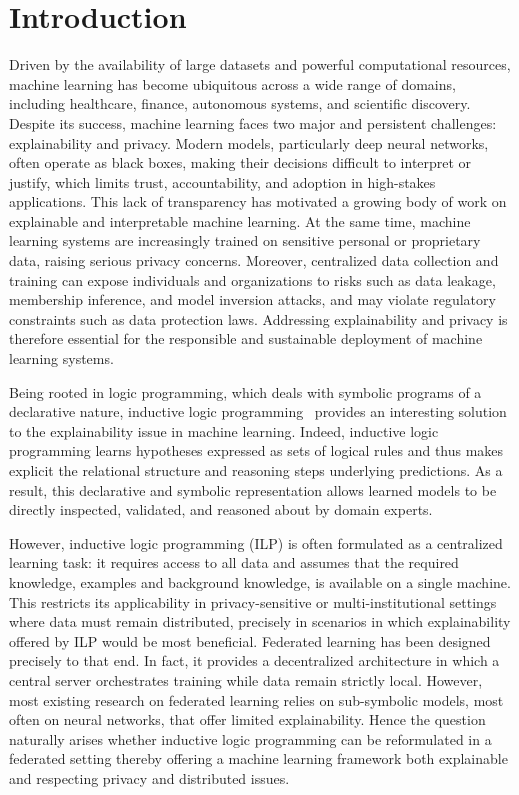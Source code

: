 \section{Introduction}

Driven by the availability of large datasets and powerful computational resources, machine learning has become ubiquitous across a wide range of domains, including healthcare, finance, autonomous systems, and scientific discovery. Despite its success, machine learning faces two major and persistent challenges: explainability and privacy. Modern models, particularly deep neural networks, often operate as black boxes, making their decisions difficult to interpret or justify, which limits trust, accountability, and adoption in high-stakes applications. This lack of transparency has motivated a growing body of work on explainable and interpretable machine learning. At the same time, machine learning systems are increasingly trained on sensitive personal or proprietary data, raising serious privacy concerns. Moreover, centralized data collection and training can expose individuals and organizations to risks such as data leakage, membership inference, and model inversion attacks, and may violate regulatory constraints such as data protection laws. Addressing explainability and privacy is therefore essential for the responsible and sustainable deployment of machine learning systems.

Being rooted in logic programming, which deals with symbolic programs of a declarative nature, inductive logic programming~\cite{de2008logical,muggleton1991inductive} provides an interesting solution to the explainability issue in machine learning. Indeed, inductive logic programming learns hypotheses expressed as sets of logical rules and thus makes explicit the relational structure and reasoning steps underlying predictions. As a result, this declarative and symbolic representation allows learned models to be directly inspected, validated, and reasoned about by domain experts.


However, inductive logic programming (ILP) is often formulated as a centralized learning task: it requires access to all data and assumes that the required knowledge, examples and background knowledge, is available on a single machine. This restricts its applicability in privacy-sensitive or multi-institutional settings where data must remain distributed, precisely in scenarios in which explainability offered by ILP would be most beneficial. Federated learning \cite{mcmahan2017communication} has been designed precisely to that end. In fact, it provides a decentralized architecture in which a central server orchestrates training while data remain strictly local. However, most existing research on federated learning relies on sub-symbolic models, most often on neural networks, that offer limited explainability. Hence the question naturally arises whether inductive logic programming can be reformulated in a federated setting thereby offering a machine learning framework both explainable and respecting privacy and distributed issues.

